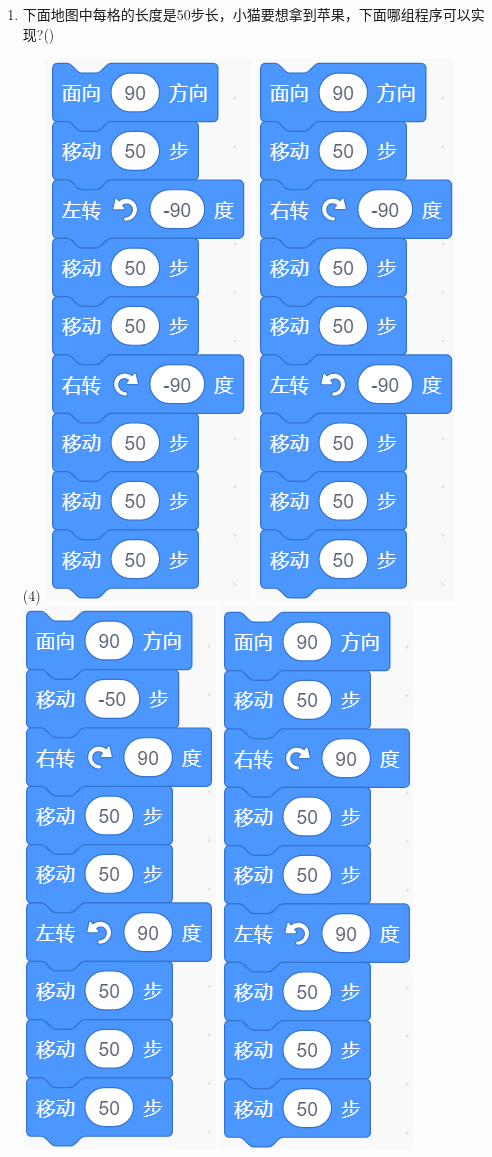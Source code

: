 \documentclass[10pt, a4paper]{article}
\begin{document}
\begin{enumerate}
        \item 下面地图中每格的长度是50步长，小猫要想拿到苹果，下面哪组程序可以实现?(\qquad)
        \begin{tasks}(4)
            \task \includegraphics[width=.12\textwidth]{7a.png}
            \task \includegraphics[width=.12\textwidth]{7b.png}
            \task \includegraphics[width=.12\textwidth]{7c.png}
            \task \includegraphics[width=.12\textwidth]{7d.png}
        \end{tasks}
           

\end{enumerate}
\end{document}
